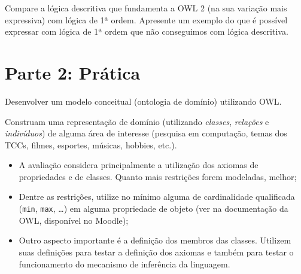 \documentclass[answers]{exam}
\newcommand{\todo}[1]{{\color{red}{#1}}}
\begin{document}
\begin{questions}
\begin{answer}
            \todo{%
                Exemplificar com elementos do domínio escolhido na parte
                prática.
            }
        \end{answer}

        \question{}
        Compare a lógica descritiva que fundamenta a OWL 2 (na sua variação
        mais expressiva) com lógica de 1ª ordem. Apresente um exemplo do que é
        possível expressar com lógica de 1ª ordem que não conseguimos com
        lógica descritiva.

        \begin{answer}
        \end{answer}
    \end{questions}

    \section{Parte 2: Prática}
    \begin{questions}
        \question{}
        Desenvolver um modelo conceitual (ontologia de domínio) utilizando
        OWL\@.

        Construam uma representação de domínio (utilizando \emph{classes},
        \emph{relações} e \emph{indivíduos}) de alguma área de interesse
        (pesquisa em computação, temas dos TCCs, filmes, esportes, músicas,
        hobbies, etc.).

        \begin{superframe}
            \begin{itemize}
                \item A avaliação considera principalmente a utilização dos
                    axiomas de propriedades e de classes. Quanto mais
                    restrições forem modeladas, melhor;

                \item Dentre as restrições, utilize no mínimo alguma de
                    cardinalidade qualificada (\texttt{min}, \texttt{max},
                    \ldots) em alguma propriedade de objeto (ver na
                    documentação da OWL, disponível no Moodle);

                \item Outro aspecto importante é a definição dos membros das
                    classes. Utilizem suas definições para testar a definição
                    dos axiomas e também para testar o funcionamento do
                    mecanismo de inferência da linguagem.
            \end{itemize}
        \end{superframe}
    \end{questions}

    
    
    \nocite{*}
\end{document}
